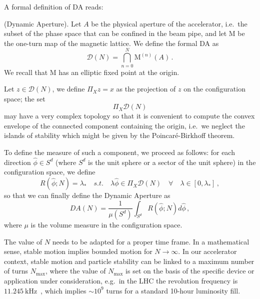 A formal definition of DA reads:
\begin{definition}
	(Dynamic Aperture). Let \(A\) be the physical aperture of the accelerator, i.e.\ the subset of the phase space that can be confined in the beam pipe, and let \(\mathrm{M}\) be the one-turn map of the magnetic lattice. We define the formal DA as
	\begin{equation}
		\mathcal{D}(N)=\bigcap_{n=0}^N \mathrm{M}^{(n)}(A)\,.
	\end{equation}
	We recall that \(\mathrm{M}\) has an elliptic fixed point at the origin.

	Let \(z\in \mathcal{D}(N)\), we define \(\Pi_X z=x\) as the projection of \(z\) on the configuration space; the set
	\begin{equation}
		\Pi_X\mathcal{D}(N)
	\end{equation}
	may have a very complex topology so that it is convenient to compute the convex envelope of the connected component containing the origin, i.e.\ we neglect the islands of stability which might be given by the Poincaré-Birkhoff theorem.

	To define the measure of such a component, we proceed as follows: for each direction \(\hat \phi\in S^d\)  (where \(S^d\) is the unit sphere or a sector of the unit sphere) in the configuration space, we define
	\begin{equation}
	    R(\hat \phi; N)=\lambda_\ast\quad s.t.\quad \lambda \hat\phi\in \Pi_X \mathcal{D}(N)\quad \forall \quad \lambda\in[0,\lambda_\ast]\,,
	    \label{eq:ideal-R}
	\end{equation}
	so that we can finally define the Dynamic Aperture as
	\begin{equation}
        DA(N)=\frac{1}{\mu(S^d)}\int_{S^d} R(\hat \phi; N)d\hat\phi\,,
        \label{eq:formal_da}
	\end{equation}
	where \(\mu\) is the volume measure in the configuration space.
	\label{def:dynamic_aperture}
\end{definition}

The value of \(N\) needs to be adapted for a proper time frame. In a mathematical sense, stable motion implies bounded motion for \(N\rightarrow\infty\). In our accelerator context, stable motion and particle stability can be linked to a maximum number of turns \(N_{\text{max}}\), where the value of \(N_{\text{max}}\) is set on the basis of the specific device or application under consideration, e.g.\ in the LHC the revolution frequency is \(\SI{11.245}{\kHz}\)~\cite{Benedikt:823808}, which implies \(\sim 10^9\) turns for a standard 10-hour luminosity fill.

